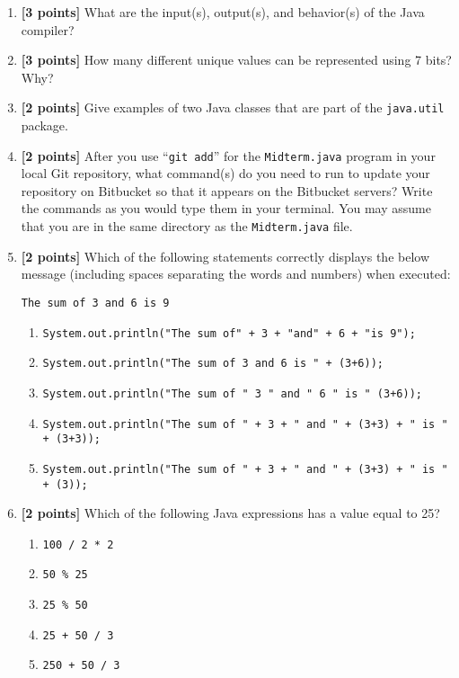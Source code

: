 \documentclass[11pt]{report}
\begin{document}
\begin{enumerate}
\item {\bf [3 points]}
What are the input(s), output(s), and behavior(s) of the Java compiler?

\vspace{.75in}
\item {\bf [3 points]}
How many different unique values can be represented using 7 bits? Why?

\bigskip
\bigskip
\bigskip
\bigskip

\item {\bf [2 points]}
Give examples of two Java classes that are part of the {\tt java.util} package.

\bigskip
\bigskip
\bigskip
\bigskip

\item {\bf [2 points]}
  After you use ``{\tt git add}'' for the {\tt Midterm.java} program in your local Git repository, what command(s) do
  you need to run to update your repository on Bitbucket so that it appears on the Bitbucket servers? Write the commands
  as you would type them in your terminal. You may assume that you are in the same directory as the {\tt Midterm.java}
  file.  

\newpage

\item {\bf [2 points]}
Which of the following statements correctly displays the below 
message (including spaces separating the words and numbers) when executed:
\begin{center}
\verb$The sum of 3 and 6 is 9$
\end{center}
\begin{enumerate}
\item \verb$System.out.println("The sum of" + 3 + "and" + 6 + "is 9");$
\item \verb$System.out.println("The sum of 3 and 6 is " + (3+6));$
\item \verb$System.out.println("The sum of " 3 " and " 6 " is " (3+6));$
\item \verb$System.out.println("The sum of " + 3 + " and " + (3+3) + " is " + (3+3));$
\item \verb$System.out.println("The sum of " + 3 + " and " + (3+3) + " is " + (3));$
\end{enumerate}

\bigskip

\item {\bf [2 points]}
Which of the following Java expressions has a value equal to 25?
\begin{enumerate}
\item \verb$100 / 2 * 2$
\item \verb$50 % 25$
\item \verb$25 % 50$
\item \verb$25 + 50 / 3$
\item \verb$250 + 50 / 3$
\end{enumerate}


\end{enumerate}
\end{document}
